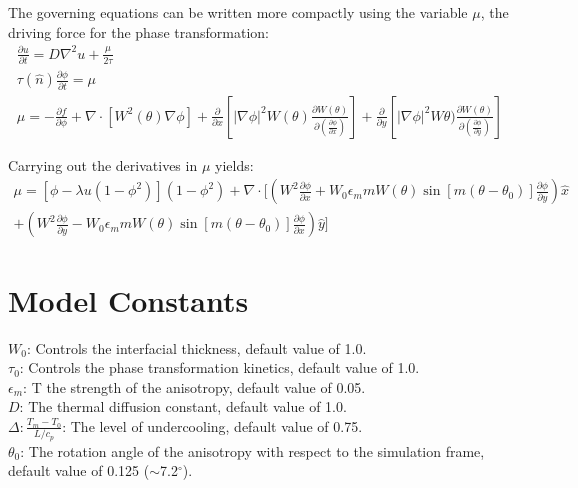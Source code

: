 \documentclass[10pt]{article}
\begin{document}
The governing equations can be written more compactly using the variable $\mu$, the driving force for the phase transformation:
\begin{gather}
\frac{\partial u}{\partial t} = D \nabla^2 u + \frac{\mu}{2 \tau} \\
\tau(\hat{n}) \frac{\partial \phi}{\partial t} = \mu \\
\mu = -\frac{\partial f}{\partial \phi} + \nabla \cdot \left[W^2(\theta) \nabla \phi \right]+  \frac{\partial}{\partial x} \left[ |\nabla \phi|^2 W(\theta) \frac{\partial W(\theta)}{\partial \left( \frac{\partial \phi}{\partial x} \right)} \right] + \frac{\partial}{\partial y} \left[ |\nabla \phi|^2 W\theta) \frac{\partial W(\theta)}{\partial \left( \frac{\partial \phi}{\partial y} \right)} \right] 
\end{gather}

Carrying out the derivatives in $\mu$ yields:
\begin{multline}
\mu = \left[ \phi - \lambda u \left(1 - \phi^2 \right) \right] \left(1-\phi^2\right) + \nabla \cdot \bigg[\left(W^2 \frac{\partial \phi}{\partial x} + W_0 \epsilon_m m W(\theta) \sin \left[ m \left(\theta - \theta_0 \right) \right] \frac{\partial \phi}{\partial y}\right)\hat{x}  \\
+ \left(W^2 \frac{\partial \phi}{\partial y} -W_0 \epsilon_m m W(\theta) \sin \left[ m \left(\theta - \theta_0 \right) \right] \frac{\partial \phi}{\partial x}\right) \hat{y} \bigg]
\end{multline}

\section{Model Constants}
$W_0$: Controls the interfacial thickness, default value of 1.0. \\
$\tau_0$: Controls the phase transformation kinetics, default value of 1.0. \\
$\epsilon_m$: T the strength of the anisotropy, default value of 0.05. \\
$D$: The thermal diffusion constant, default value of 1.0. \\
$\Delta: \frac{T_m-T_0}{L/c_p}$: The level of undercooling, default value of 0.75. \\
$\theta_0$: The rotation angle of the anisotropy with respect to the simulation frame, default value of 0.125 ($\sim$7.2$^\circ$).
\end{document}
